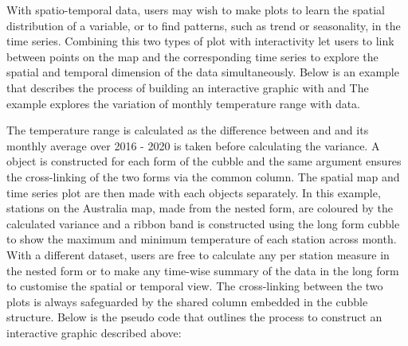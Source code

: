 \documentclass[
]{jss}
\begin{document}
With spatio-temporal data, users may wish to make plots to learn the
spatial distribution of a variable, or to find patterns, such as trend
or seasonality, in the time series. Combining this two types of plot
with interactivity let users to link between points on the map and the
corresponding time series to explore the spatial and temporal dimension
of the data simultaneously. Below is an example that describes the
process of building an interactive graphic with  and
 The example explores the variation of monthly
temperature range with  data.

The temperature range is calculated as the difference between
 and  and its monthly average over 2016 - 2020 is
taken before calculating the variance. A  object is
constructed for each form of the cubble and the same 
argument ensures the cross-linking of the two forms via the common
 column. The spatial map and time series plot are then made
with each  objects separately. In this example,
stations on the Australia map, made from the nested form, are coloured
by the calculated variance and a ribbon band is constructed using the
long form cubble to show the maximum and minimum temperature of each
station across month. With a different dataset, users are free to
calculate any per station measure in the nested form or to make any
time-wise summary of the data in the long form to customise the spatial
or temporal view. The cross-linking between the two plots is always
safeguarded by the shared  column embedded in the cubble
structure. Below is the pseudo code that outlines the process to
construct an interactive graphic described above:
\end{document}
